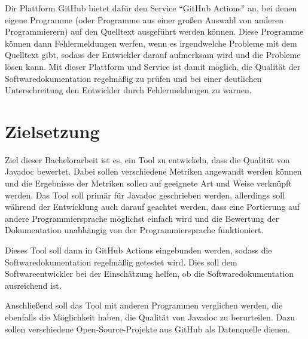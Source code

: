 Dir Plattform GitHub bietet dafür den Service \enquote{GitHub Actions} \cite{GithubActions} an, bei denen eigene Programme (oder Programme aus einer großen Auswahl von anderen Programmierern) auf den Quelltext ausgeführt werden können. Diese Programme können dann Fehlermeldungen werfen, wenn es irgendwelche Probleme mit dem Quelltext gibt, sodass der Entwickler darauf aufmerksam wird und die Probleme lösen kann. Mit dieser Plattform und Service ist damit möglich, die Qualität der Softwaredokumentation regelmäßig zu prüfen und bei einer deutlichen Unterschreitung den Entwickler durch Fehlermeldungen zu warnen. 


\section{Zielsetzung}
Ziel dieser Bachelorarbeit ist es, ein Tool zu entwickeln, dass die Qualität von Javadoc bewertet. Dabei sollen verschiedene Metriken angewandt werden können und die Ergebnisse der Metriken sollen auf geeignete Art und Weise verknüpft werden. Das Tool soll primär für Javadoc geschrieben werden, allerdings soll während der Entwicklung auch darauf geachtet werden, dass eine Portierung auf andere Programmiersprache möglichst einfach wird und die Bewertung der Dokumentation unabhängig von der Programmiersprache funktioniert. 

Dieses Tool soll dann in GitHub Actions eingebunden werden, sodass die Softwaredokumentation regelmäßig getestet wird.  Dies soll dem Softwareentwickler bei der Einschätzung helfen, ob die Softwaredokumentation ausreichend ist. 

Anschließend soll das Tool mit anderen Programmen verglichen werden, die ebenfalls die Möglichkeit haben, die Qualität von Javadoc zu berurteilen. Dazu sollen verschiedene Open-Source-Projekte aus GitHub als Datenquelle dienen. 


